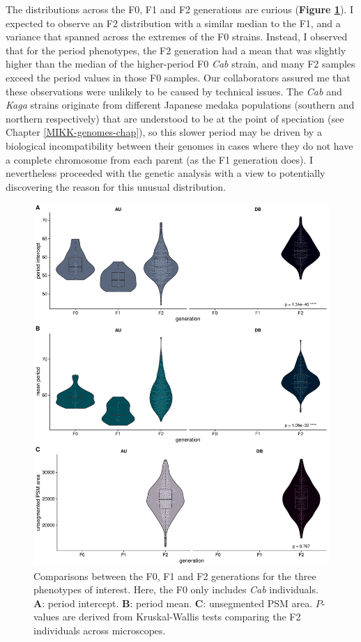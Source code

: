 \documentclass[
]{book}
\begin{document}
The distributions across the F0, F1 and F2 generations are curious (\textbf{Figure \ref{fig:somite-phenos}}). I expected to observe an F2 distribution with a similar median to the F1, and a variance that spanned across the extremes of the F0 strains. Instead, I observed that for the period phenotypes, the F2 generation had a mean that was slightly higher than the median of the higher-period F0 \emph{Cab} strain, and many F2 samples exceed the period values in those F0 samples. Our collaborators assured me that these observations were unlikely to be caused by technical issues. The \emph{Cab} and \emph{Kaga} strains originate from different Japanese medaka populations (southern and northern respectively) that are understood to be at the point of speciation (see Chapter \ref{MIKK-genomes-chap}), so this slower period may be driven by a biological incompatibility between their genomes in cases where they do not have a complete chromosome from each parent (as the F1 generation does). I nevertheless proceeded with the genetic analysis with a view to potentially discovering the reason for this unusual distribution.



\begin{figure}
\includegraphics[width=1\linewidth]{figs/somites/phenotypes} \caption{Comparisons between the F0, F1 and F2 generations for the three phenotypes of interest. Here, the F0 only includes \emph{Cab} individuals. \textbf{A}: period intercept. \textbf{B}: period mean. \textbf{C}: unsegmented PSM area. \(P\)-values are derived from Kruskal-Wallis tests comparing the F2 individuals across microscopes.}\label{fig:somite-phenos}
\end{figure}
\end{document}
